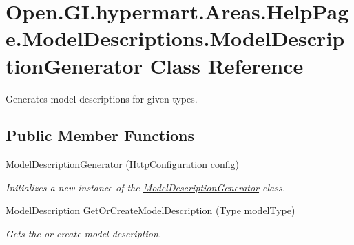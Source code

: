 \hypertarget{class_open_1_1_g_i_1_1hypermart_1_1_areas_1_1_help_page_1_1_model_descriptions_1_1_model_description_generator}{}\section{Open.\+G\+I.\+hypermart.\+Areas.\+Help\+Page.\+Model\+Descriptions.\+Model\+Description\+Generator Class Reference}
\label{class_open_1_1_g_i_1_1hypermart_1_1_areas_1_1_help_page_1_1_model_descriptions_1_1_model_description_generator}


Generates model descriptions for given types.  


\subsection*{Public Member Functions}
\begin{DoxyCompactItemize}
\item 
\hyperlink{class_open_1_1_g_i_1_1hypermart_1_1_areas_1_1_help_page_1_1_model_descriptions_1_1_model_description_generator_a56c6ca4b29667cf648929f4bbedca964}{Model\+Description\+Generator} (Http\+Configuration config)
\begin{DoxyCompactList}\small\item\em Initializes a new instance of the \hyperlink{class_open_1_1_g_i_1_1hypermart_1_1_areas_1_1_help_page_1_1_model_descriptions_1_1_model_description_generator}{Model\+Description\+Generator} class. \end{DoxyCompactList}\item 
\hyperlink{class_open_1_1_g_i_1_1hypermart_1_1_areas_1_1_help_page_1_1_model_descriptions_1_1_model_description}{Model\+Description} \hyperlink{class_open_1_1_g_i_1_1hypermart_1_1_areas_1_1_help_page_1_1_model_descriptions_1_1_model_description_generator_aa693e668d64aa73688aaa4fc080eb525}{Get\+Or\+Create\+Model\+Description} (Type model\+Type)
\begin{DoxyCompactList}\small\item\em Gets the or create model description. \end{DoxyCompactList}\end{DoxyCompactItemize}
